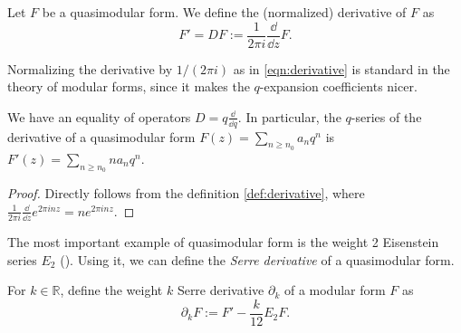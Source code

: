 \begin{definition}\label{def:derivative}  \leanok
Let $F$ be a quasimodular form.
We define the (normalized) derivative of $F$ as
\begin{equation}\label{eqn:derivative}
    F' = DF := \frac{1}{2\pi i} \frac{\dd}{\dd z} F.
\end{equation}
\end{definition}

Normalizing the derivative by $1/(2 \pi i)$ as in \eqref{eqn:derivative} is standard in the theory of modular forms, since it makes the $q$-expansion coefficients nicer.
\begin{lemma}\label{lemma:der-q-series}\leanok
We have an equality of operators $D = q \frac{\dd}{\dd q}$.
In particular, the $q$-series of the derivative of a quasimodular form $F(z) = \sum_{n \ge n_0} a_n q^n$ is $F'(z) = \sum_{n \ge n_0} n a_n q^n$.
\end{lemma}
\begin{proof}\leanok
Directly follows from the definition \eqref{def:derivative}, where $\frac{1}{2 \pi i}\frac{\dd}{\dd z}e^{2\pi i n z} = n e^{2\pi i n z}$.
\end{proof}

The most important example of quasimodular form is the weight 2 Eisenstein series $E_2$ ().
Using it, we can define the \emph{Serre derivative} of a quasimodular form.

\begin{definition}\label{def:serre-der}\leanok {}
For $k \in \mathbb{R}$, define the weight $k$ Serre derivative $\partial_{k}$ of a modular form $F$ as
\begin{equation}\label{eqn:serre-der}
    \partial_{k}F := F' - \frac{k}{12} E_2 F.
\end{equation}
\end{definition}

